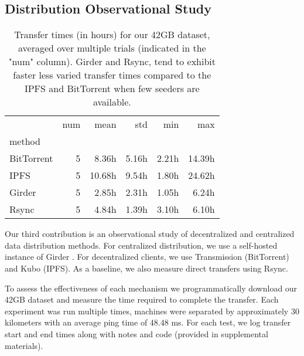 \documentclass[10pt,twocolumn,letterpaper]{article}
\begin{document}
\subsection{Distribution Observational Study}

\begin{table}[t]
\begin{tabular}{lrrrrr}
\toprule
{}      & num &   mean &    std &   min &    max \\
method         &       &        &       &       & \\
\midrule
BitTorrent & 5 &  8.36h &   5.16h &  2.21h & 14.39h \\
IPFS       & 5 & 10.68h & 9.54h & 1.80h & 24.62h \\
Girder     & 5 & 2.85h  &  2.31h  & 1.05h & 6.24h \\
Rsync      & 5 & 4.84h & 1.39h & 3.10h & 6.10h \\

\bottomrule
\end{tabular}
\caption[]{
Transfer times (in hours) for our 42GB dataset, averaged over multiple trials (indicated in the "num" column).
Girder and Rsync, tend to exhibit faster less varied transfer times compared to
the IPFS and BitTorrent when few seeders are available.
}
\label{tab:transfertime}
\end{table}

Our third contribution is an observational study of decentralized and centralized data distribution methods.
For centralized distribution, we use a self-hosted instance of Girder
  \cite{girder_2024}.
For decentralized clients, we use Transmission \cite{transmission_2024} (BitTorrent)
  and Kubo \cite{ipfskubo_2024} (IPFS).
As a baseline, we also measure direct transfers using Rsync\cite{rsyncprojectrsync_2024}.


To assess the effectiveness of each mechanism we programmatically download our 42GB dataset and measure the
  time required to complete the transfer.
Each experiment was run multiple times, machines were separated by approximately 30 kilometers with an
  average ping time of 48.48 ms.
For each test, we log transfer start and end times along with notes and code (provided in supplemental
  materials).
\end{document}
